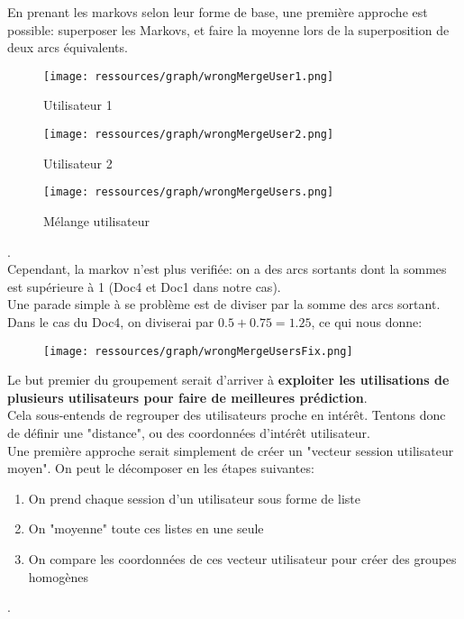             En prenant les markovs selon leur forme de base, une première approche est possible: superposer les Markovs, et faire la moyenne lors de la superposition de deux arcs équivalents.
            \begin{figure}[h]
                \centering
                \begin{minipage}{0.3\textwidth}
                    \texttt{[image: ressources/graph/wrongMergeUser1.png]}
                    \caption{Utilisateur 1}
                \end{minipage}
                \begin{minipage}{0.3\textwidth}
                    \texttt{[image: ressources/graph/wrongMergeUser2.png]}
                    \caption{Utilisateur 2}
                \end{minipage}
                \begin{minipage}{0.3\textwidth}
                    \texttt{[image: ressources/graph/wrongMergeUsers.png]}
                    \caption{Mélange utilisateur}
                \end{minipage}
            \end{figure}.\\

            Cependant, la markov n'est plus verifiée: on a des arcs sortants dont la sommes est supérieure à 1 (Doc4 et Doc1 dans notre cas).\\
            Une parade simple à se problème est de diviser par la somme des arcs sortant. Dans le cas du Doc4, on diviserai par $0.5+0.75=1.25$, ce qui nous donne:
            \begin{figure}[h]
                \centering
                \texttt{[image: ressources/graph/wrongMergeUsersFix.png]}
            \end{figure}


            Le but premier du groupement serait d'arriver à \textbf{exploiter les utilisations de plusieurs utilisateurs pour faire de meilleures prédiction}.\\
            Cela sous-entends de regrouper des utilisateurs proche en intérêt. Tentons donc de définir une "distance", ou des coordonnées d'intérêt utilisateur.\\

            Une première approche serait simplement de créer un "vecteur session utilisateur moyen". On peut le décomposer en les étapes suivantes:
            \begin{enumerate}
                \item On prend chaque session d'un utilisateur sous forme de liste
                \item On "moyenne" toute ces listes en une seule
                \item On compare les coordonnées de ces vecteur utilisateur pour créer des groupes homogènes
            \end{enumerate}.\\

